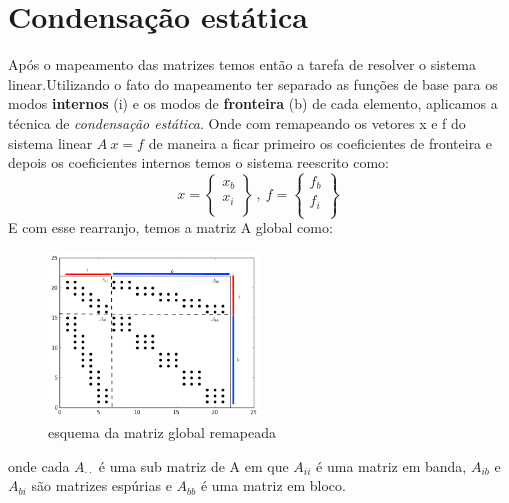 \pagebreak

\section{Condensação estática}
  Após o mapeamento das matrizes temos então a tarefa de resolver o sistema linear.Utilizando o fato do mapeamento ter separado as funções de base para os modos \textbf{internos} (i) e os modos de \textbf{fronteira} (b) de cada elemento, aplicamos a técnica de \emph{condensação estática}. Onde com remapeando os vetores x e f do sistema linear $A\  x = f$ de maneira a ficar primeiro os coeficientes de fronteira e depois os coeficientes internos temos o sistema reescrito como:
  \begin{equation}
    x = \left\{\begin{matrix} x_b \\ x_i \\ \end{matrix}\right\}\ ,\ f =  \left\{\begin{matrix} f_b \\ f_i \\ \end{matrix}\right\}\
  \end{equation}
E com esse rearranjo, temos a matriz A global como:
\begin{figure}[H]
\centering
\includegraphics[width=0.5\textwidth,center]{figuras/Matriz_global.png}
\caption{esquema da matriz global remapeada} 
\end{figure}
onde cada $A_{\cdot \cdot}$ é uma sub matriz de A em que $A_{ii}$ é uma matriz em banda, $A_{ib}$ e $A_{bi}$ são  matrizes espúrias e $A_{bb}$ é uma matriz em bloco.


